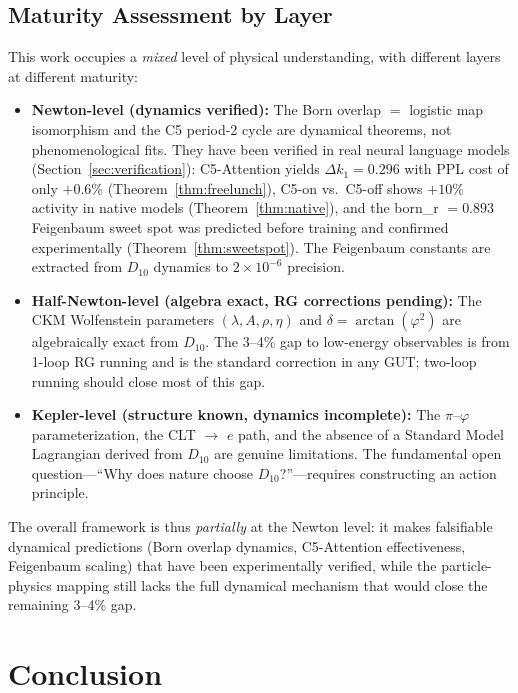 \documentclass[11pt,a4paper]{article}
\begin{document}
\subsection{Maturity Assessment by Layer}

This work occupies a \emph{mixed} level of physical understanding, with different layers at different maturity:

\begin{itemize}
\item \textbf{Newton-level (dynamics verified):} The Born overlap $=$ logistic map isomorphism and the C5 period-2 cycle are dynamical theorems, not phenomenological fits. They have been verified in real neural language models (Section~\ref{sec:verification}): C5-Attention yields $\Delta k_1 = 0.296$ with PPL cost of only $+0.6\%$ (Theorem~\ref{thm:freelunch}), C5-on vs.\ C5-off shows $+10\%$ activity in native models (Theorem~\ref{thm:native}), and the born\_r $= 0.893$ Feigenbaum sweet spot was predicted before training and confirmed experimentally (Theorem~\ref{thm:sweetspot}). The Feigenbaum constants are extracted from $D_{10}$ dynamics to $2 \times 10^{-6}$ precision.

\item \textbf{Half-Newton-level (algebra exact, RG corrections pending):} The CKM Wolfenstein parameters $(\lambda, A, \rho, \eta)$ and $\delta = \arctan(\varphi^2)$ are algebraically exact from $D_{10}$. The 3--4\% gap to low-energy observables is from 1-loop RG running and is the standard correction in any GUT; two-loop running should close most of this gap.

\item \textbf{Kepler-level (structure known, dynamics incomplete):} The $\pi$--$\varphi$ parameterization, the CLT $\to$ $e$ path, and the absence of a Standard Model Lagrangian derived from $D_{10}$ are genuine limitations. The fundamental open question---``Why does nature choose $D_{10}$?''---requires constructing an action principle.
\end{itemize}

The overall framework is thus \emph{partially} at the Newton level: it makes falsifiable dynamical predictions (Born overlap dynamics, C5-Attention effectiveness, Feigenbaum scaling) that have been experimentally verified, while the particle-physics mapping still lacks the full dynamical mechanism that would close the remaining 3--4\% gap.

\section{Conclusion}
\end{document}
